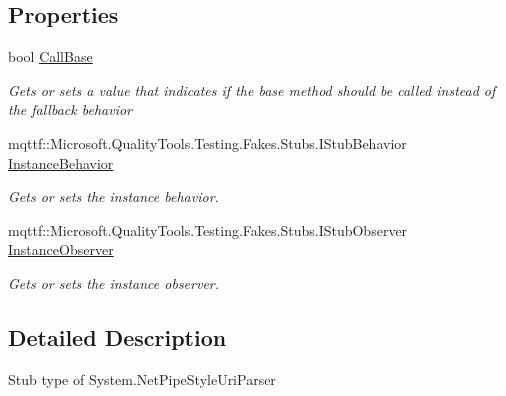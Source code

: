 \subsection*{Properties}
\begin{DoxyCompactItemize}
\item 
bool \hyperlink{class_system_1_1_fakes_1_1_stub_net_pipe_style_uri_parser_a8f4d47c713105303f7d8f5be8b113a8f}{Call\-Base}
\begin{DoxyCompactList}\small\item\em Gets or sets a value that indicates if the base method should be called instead of the fallback behavior\end{DoxyCompactList}\item 
mqttf\-::\-Microsoft.\-Quality\-Tools.\-Testing.\-Fakes.\-Stubs.\-I\-Stub\-Behavior \hyperlink{class_system_1_1_fakes_1_1_stub_net_pipe_style_uri_parser_a25ac806658cb7bd7241af54781520c47}{Instance\-Behavior}
\begin{DoxyCompactList}\small\item\em Gets or sets the instance behavior.\end{DoxyCompactList}\item 
mqttf\-::\-Microsoft.\-Quality\-Tools.\-Testing.\-Fakes.\-Stubs.\-I\-Stub\-Observer \hyperlink{class_system_1_1_fakes_1_1_stub_net_pipe_style_uri_parser_ac54e5168390830f8bc8911567f5a712e}{Instance\-Observer}
\begin{DoxyCompactList}\small\item\em Gets or sets the instance observer.\end{DoxyCompactList}\end{DoxyCompactItemize}


\subsection{Detailed Description}
Stub type of System.\-Net\-Pipe\-Style\-Uri\-Parser



